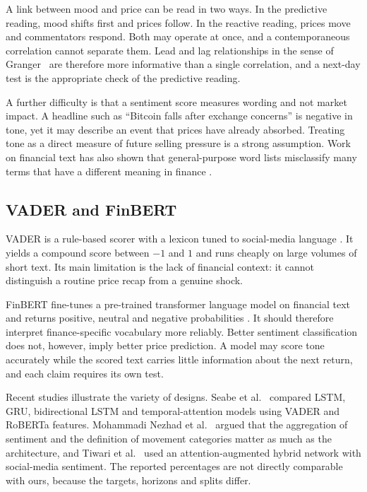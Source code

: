 A link between mood and price can be read in two ways. In the predictive reading, mood shifts first and prices follow. In the reactive reading, prices move and commentators respond. Both may operate at once, and a contemporaneous correlation cannot separate them. Lead and lag relationships in the sense of Granger~\cite{granger1969} are therefore more informative than a single correlation, and a next-day test is the appropriate check of the predictive reading.

A further difficulty is that a sentiment score measures wording and not market impact. A headline such as ``Bitcoin falls after exchange concerns'' is negative in tone, yet it may describe an event that prices have already absorbed. Treating tone as a direct measure of future selling pressure is a strong assumption. Work on financial text has also shown that general-purpose word lists misclassify many terms that have a different meaning in finance \cite{loughran2011}.

\subsection{VADER and FinBERT}
VADER is a rule-based scorer with a lexicon tuned to social-media language \cite{hutto2014}. It yields a compound score between $-1$ and $1$ and runs cheaply on large volumes of short text. Its main limitation is the lack of financial context: it cannot distinguish a routine price recap from a genuine shock.

FinBERT fine-tunes a pre-trained transformer language model \cite{devlin2019} on financial text and returns positive, neutral and negative probabilities \cite{araci2019}. It should therefore interpret finance-specific vocabulary more reliably. Better sentiment classification does not, however, imply better price prediction. A model may score tone accurately while the scored text carries little information about the next return, and each claim requires its own test.

Recent studies illustrate the variety of designs. Seabe et al.~\cite{seabe2025} compared LSTM, GRU, bidirectional LSTM and temporal-attention models using VADER and RoBERTa features. Mohammadi Nezhad et al.~\cite{nezhad2026} argued that the aggregation of sentiment and the definition of movement categories matter as much as the architecture, and Tiwari et al.~\cite{tiwari2025} used an attention-augmented hybrid network with social-media sentiment. The reported percentages are not directly comparable with ours, because the targets, horizons and splits differ.


